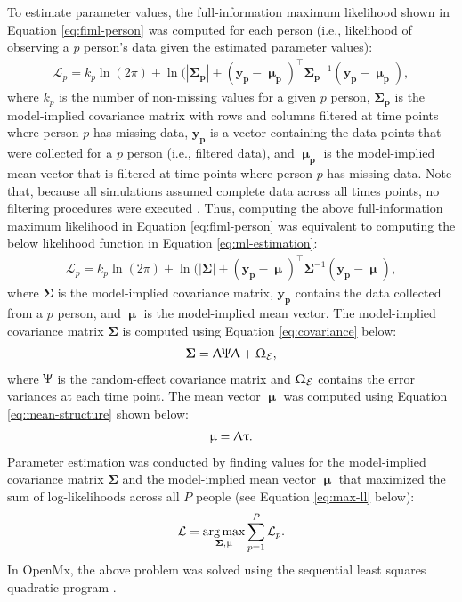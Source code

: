 \documentclass[
12pt, %
twoside,
english]{guelphthesis}
\begin{document}
To estimate parameter values, the full-information maximum
likelihood shown in Equation \ref{eq:fiml-person} was computed for each
person (i.e., likelihood of observing a \(p\) person's data given the
estimated parameter values):
\begin{align}
\mathcal{L}_p = k_p \ln(2\pi) + \ln(|\mathbf{\Sigma_p}| + (\mathbf{y_p} - \mathbf{\upmu_p})^\top \mathbf{\Sigma_p}^{-1}(\mathbf{y_p} - \mathbf{\upmu_p}),
\label{eq:fiml-person}
\end{align}
\noindent where \(k_p\) is the number of non-missing values for a given
\(p\) person, \(\mathbf{\Sigma_p}\) is the model-implied covariance matrix
with rows and columns filtered at time points where person \(p\) has
missing data, \(\mathbf{y_p}\) is a vector containing the data points that
were collected for a \(p\) person (i.e., filtered data), and
\(\mathbf{\upmu_p}\) is the model-implied mean vector that is filtered at
time points where person \(p\) has missing data. Note that, because all
simulations assumed complete data across all times points, no filtering
procedures were executed \autocite[for a review of the filtering procedure, see][Chapter 5]{boker2020}. Thus, computing the above full-information
maximum likelihood in Equation \ref{eq:fiml-person} was equivalent to
computing the below likelihood function in Equation
\ref{eq:ml-estimation}:
\begin{align}
\mathcal{L}_p = k_p \ln(2\pi) + \ln(|\mathbf{\Sigma}| + (\mathbf{y_p} - \mathbf{\upmu})^\top \mathbf{\Sigma}^{-1}(\mathbf{y_p} - \mathbf{\upmu}),  
\label{eq:ml-estimation}
\end{align}
\noindent where \(\mathbf{\Sigma}\) is the model-implied covariance matrix,
\(\mathbf{y_p}\) contains the data collected from a \(p\) person, and
\(\mathbf{\upmu}\) is the model-implied mean vector. The model-implied
covariance matrix \(\mathbf{\Sigma}\) is computed using Equation
\ref{eq:covariance} below:
\begin{align}
\mathbf{\Sigma} = \mathbf{\Uplambda\Uppsi\Uplambda} + \mathbf{\Upomega}_{\mathcal{E}},   
\label{eq:covariance}
\end{align}
\noindent where \(\mathbf{\Uppsi}\) is the random-effect covariance matrix
and \(\mathbf{\Upomega}_{\mathcal{E}}\) contains the error variances at
each time point. The mean vector \(\mathbf{\upmu}\) was computed using
Equation \ref{eq:mean-structure} shown below:
\begin{align}
\mathbf{\upmu} = \mathbf{\Uplambda\uptau}. 
\label{eq:mean-structure}
\end{align}
\noindent Parameter estimation was conducted by finding values for the model-implied
covariance matrix \(\mathbf{\Sigma}\) and the model-implied mean vector
\(\mathbf{\upmu}\) that maximized the sum of log-likelihoods across all \(P\) people
(see Equation \ref{eq:max-ll} below):
\begin{align}
\mathcal{L} = \underset{\mathbf{\Sigma},\mathbf{\upmu} }{\operatorname*{arg\,max}} \sum^P_{p = 1} \mathcal{L}_p.
\label{eq:max-ll}
\end{align}
\noindent In OpenMx, the above problem was solved using the sequential
least squares quadratic program \autocite[for a review, see][]{kraft1994}.
\end{document}
